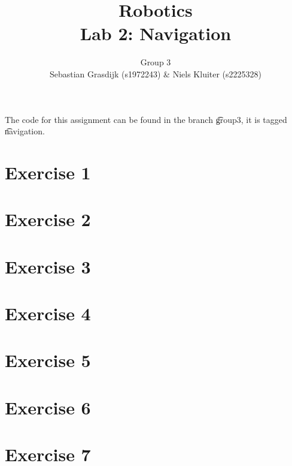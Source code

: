 \documentclass[a4paper]{article}
\title{Robotics\\ Lab 2: Navigation}
\author{Group 3\\Sebastian Grasdijk (s1972243) \& Niels Kluiter (s2225328)}
\begin{document}
\maketitle

\noindent The code for this assignment can be found in the branch \t{group3}, it is tagged \t{navigation}.

\section*{Exercise 1}


\section*{Exercise 2}


\section*{Exercise 3}


\section*{Exercise 4}


\section*{Exercise 5}


\section*{Exercise 6}


\section*{Exercise 7}


\printbibliography

\clearpage
\appendix

\end{document}
